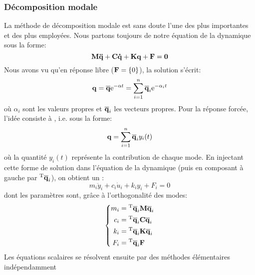 \subsubsection{Décomposition modale}
La méthode de décomposition modale est sans doute l'une des plus importantes et des plus
employées.
\medskipvm
Nous partons toujours de notre équation de la dynamique sous la forme:
\begin{equation} \MM{M}\VV{\ddot{q}}+\MM{C}\VV{\dot{q}}+\MM{K}\VV{q}+\VV{F} = \VV{0} \end{equation}
\medskipvm
Nous avons vu qu'en réponse libre ($\VV{F}=\{0\}$), la solution s'écrit:
\begin{equation} \VV{q} = \VV{\overline{q}} \mathrm{e}^{-\alpha t} = \dsum_{i=1}^n \VV{\overline{q}}_i \mathrm{e}^{-\alpha_i t} \end{equation}
où $\alpha_i$ sont les valeurs propres et $\VV{\overline{q}}_i$ les vecteurs propres.
\medskipvm
Pour la réponse forcée, l'idée consiste à , i.e. sous la forme:
\begin{equation} \VV{q} = \dsum_{i=1}^n \VV{\overline{q}}_i y_i(t) \end{equation}
où la quantité $y_i(t)$ représente la contribution de chaque mode. 
\medskipvm
En injectant cette forme de solution dans l'équation de la dynamique (puis en composant à gauche par 
${}^\mathrm{T}\mathbf{\overline{q}}_i$), on obtient un :
\begin{equation} m_i\ddot{y}_i+c_i\dot{u}_i+k_iy_i+F_i = 0 \end{equation}
dont les paramètres sont, grâce à l'orthogonalité des modes:
\begin{equation}\left\{
\begin{aligned}
	m_i &= \LL{\overline{q}}_i\MM{M}\VV{\overline{q}}_i\\
	c_i &= \LL{\overline{q}}_i\MM{C}\VV{\overline{q}}_i\\
	k_i &= \LL{\overline{q}}_i\MM{K}\VV{\overline{q}}_i\\
	F_i &= \LL{\overline{q}}_i\VV{F}
\end{aligned}
\right.\end{equation}
Les équations scalaires se résolvent ensuite par des méthodes élémentaires indépendamment
